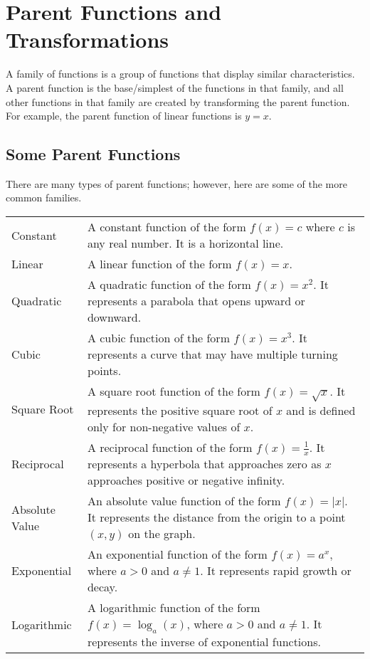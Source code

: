 \documentclass{article}
\begin{document}
\section{Parent Functions and Transformations}

A family of functions is a group of functions that display similar characteristics. A parent function is the base/simplest of the functions in that family, and all other functions in that family are created by transforming the parent function. For example, the parent function of linear functions is $y=x$.

\subsection{Some Parent Functions}

There are many types of parent functions; however, here are some of the more common families.

\renewcommand{\arraystretch}{1.25}
\begin{table}[H]
    \centering
    \begin{tabular}{p{2cm} p{10cm}}
    Constant & A constant function of the form $f(x) = c$ where $c$ is any real number. It is a horizontal line. \\ 
    Linear & A linear function of the form $f(x) = x$. \\
    Quadratic & A quadratic function of the form $f(x) = x^2$. It represents a parabola that opens upward or downward. \\
    Cubic & A cubic function of the form $f(x) = x^3$. It represents a curve that may have multiple turning points. \\
    Square Root & A square root function of the form $f(x) = \sqrt{x}$. It represents the positive square root of $x$ and is defined only for non-negative values of $x$. \\
    Reciprocal & A reciprocal function of the form $f(x) = \frac{1}{x}$. It represents a hyperbola that approaches zero as $x$ approaches positive or negative infinity. \\
    Absolute Value & An absolute value function of the form $f(x) = |x|$. It represents the distance from the origin to a point $(x,y)$ on the graph. \\
    Exponential & An exponential function of the form $f(x) = a^x$, where $a > 0$ and $a \neq 1$. It represents rapid growth or decay. \\
    Logarithmic & A logarithmic function of the form $f(x) = \log_a(x)$, where $a > 0$ and $a \neq 1$. It represents the inverse of exponential functions.
    \end{tabular}
\end{table}
\renewcommand{\arraystretch}{1}
\end{document}
